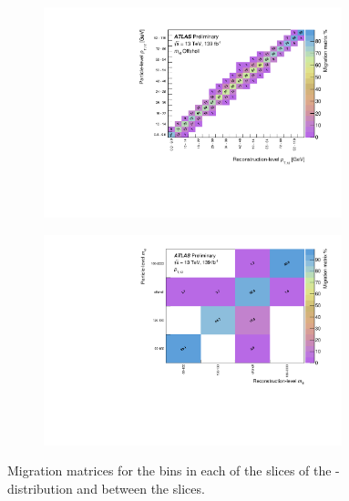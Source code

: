\begin{figure}[htb]
  \begin{subfigure}{.49\textwidth}\centering\includegraphics[width = 0.95\textwidth]{Figures/m4l/UnfoldingStudies/v014_matrices/pt12_m4loffshellMatrix.pdf}\end{subfigure}
  \begin{subfigure}{.49\textwidth}\centering\includegraphics[width = 0.95\textwidth]{Figures/m4l/UnfoldingStudies/v014_matrices/pt12_m4lMatrix.pdf}\end{subfigure}
\caption{Migration matrices for the \ptZOne bins in each of the \mFourL slices of the \ptZOne-\mFourL distribution and between the slices.}
 \end{figure}

\FloatBarrier
\clearpage


